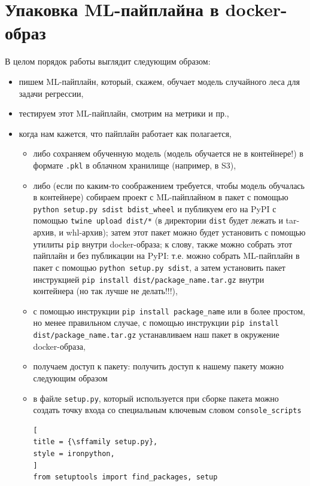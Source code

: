 \documentclass[%
	11pt,
	a4paper,
	utf8,
		]{article}
\begin{document}
\section{Упаковка ML-пайплайна в docker-образ}

В целом порядок работы выглядит следующим образом:

\begin{itemize}
	\item пишем ML-пайплайн, который, скажем, обучает модель случайного леса для задачи регрессии,
	
	\item тестируем этот ML-пайплайн, смотрим на метрики и пр.,
	
	\item когда нам кажется, что пайплайн работает как полагается,
	\begin{itemize}
		\item либо сохраняем обученную модель (модель обучается не в контейнере!) в формате \texttt{.pkl} в облачном хранилище (например, в S3),
		
		\item либо (если по каким-то соображением требуется, чтобы модель обучалась в контейнере) собираем проект с ML-пайплайном в пакет с помощью \texttt{python setup.py sdist bdist\_wheel} и публикуем его на PyPI с помощью \texttt{twine upload dist/*} (в директории \texttt{dist} будет лежать и tar-архив, и whl-архив); затем этот пакет можно будет установить с помощью утилиты \texttt{pip} внутри docker-образа; к слову, также можно собрать этот пайплайн и без публикации на PyPI: т.е. можно собрать ML-пайплайн в пакет с помощью \texttt{python setup.py sdist}, а затем установить пакет инструкцией \texttt{pip install dist/package\_name.tar.gz} внутри контейнера (но так лучше не делать!!!),

	    \item с помощью инструкции \texttt{pip install package\_name} или в более простом, но менее правильном случае, с помощью инструкции \texttt{pip install dist/package\_name.tar.gz} устанавливаем наш пакет в окружение docker-образа,
    
	    \item получаем доступ к пакету: получить доступ к нашему пакету можно следующим образом
	\end{itemize}
    \begin{itemize}
    	\item в файле \texttt{setup.py}, который используется при сборке пакета можно создать точку входа со специальным ключевым словом \texttt{console\_scripts}
\begin{lstlisting}[
title = {\sffamily setup.py},
style = ironpython,
]
from setuptools import find_packages, setup


\end{lstlisting}
\end{itemize}
\end{itemize}
\end{document}
